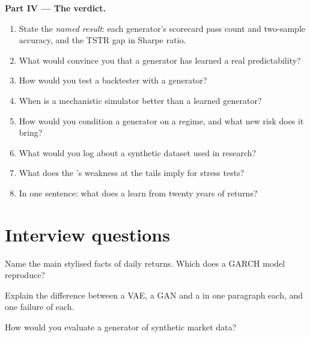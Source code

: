\begin{problem}
\medskip\noindent\textbf{Part IV --- The verdict.}
\begin{enumerate}[resume]
\item State the \emph{named result}: each generator's scorecard pass count and two-sample accuracy, and the TSTR gap in
Sharpe ratio.
\item What would convince you that a generator has learned a real predictability?
\item How would you test a backtester with a generator?
\item When is a mechanistic simulator better than a learned generator?
\item How would you condition a generator on a regime, and what new risk does it bring?
\item What would you log about a synthetic dataset used in research?
\item What does the 's weakness at the tails imply for stress tests?
\item In one sentence: what does a  learn from twenty years of returns?
\end{enumerate}
\end{problem}

\section{Interview questions}

\begin{interviewq}\label{iq:ml:generative-models-and-synthetic-data:1}
Name the main stylised facts of daily returns. Which does a GARCH model reproduce?
\end{interviewq}

\begin{interviewq}\label{iq:ml:generative-models-and-synthetic-data:2}
Explain the difference between a VAE, a GAN and a  in one paragraph each, and one failure of each.
\end{interviewq}

\begin{interviewq}\label{iq:ml:generative-models-and-synthetic-data:3}
How would you evaluate a generator of synthetic market data?
\end{interviewq}

